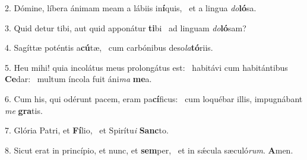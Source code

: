 2. Dómine, líbera ánimam meam a lábiis in\textbf{í}quis, \ast\  et a lingua \textit{do}\textbf{ló}sa.\

3. Quid detur tibi, aut quid apponátur \textbf{ti}bi \ast\  ad linguam \textit{do}\textbf{ló}sam?\

4. Sagíttæ poténtis a\textbf{cú}tæ, \ast\  cum carbónibus deso\textit{la}\textbf{tó}riis.\

5. Heu mihi! quia incolátus meus prolongátus est: \dag\  habitávi cum habitántibus \textbf{Ce}dar: \ast\  multum íncola fuit áni\textit{ma} \textbf{me}a.\

6. Cum his, qui odérunt pacem, eram pa\textbf{cí}ficus: \ast\  cum loquébar illis, impugnábant \textit{me} \textbf{gra}tis.\

7. Glória Patri, et \textbf{Fí}lio, \ast\  et Spirítu\textit{i} \textbf{Sanc}to.\

8. Sicut erat in princípio, et nunc, et \textbf{sem}per, \ast\  et in sǽcula sæculó\textit{rum}. \textbf{A}men.\


